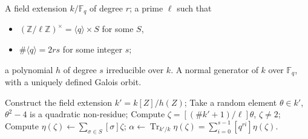 \documentclass{mcom-l}
\theoremstyle{plain}
\theoremstyle{definition}
\DeclareMathOperator{\trace}{Tr} %
\newcommand{\Z}{\ensuremath{\mathbb{Z}}}
\newcommand{\F}{\ensuremath{\mathbb{F}}}
\newcounter{algorithm}
\begin{document}
\begin{algorithm}
  \label{algorithm:rains-conic}
  \begin{algorithmic}[1]
    \REQUIRE A field extension $k/\F_q$ of degree $r$; a prime $\ell$
    such that
    \begin{itemize}
    \item $(\Z/\ell\Z)^\times = \langle q\rangle \times S$ for some $S$,
    \item $\#\langle q\rangle = 2rs$ for some integer $s$;
    \end{itemize}
    a polynomial $h$ of degree $s$ irreducible over $k$.
    \ENSURE A normal generator of $k$ over $\F_q$,
    with a uniquely defined Galois orbit.
    
    \STATE Construct the field extension $k'=k[Z]/h(Z)$;
    \REPEAT
    \REPEAT
    \STATE Take a random element $\theta\in k'$,
    \UNTIL\label{algorithm:rains-conic:sqtest} $\theta^2-4$ is a quadratic non-residue;
    \STATE\label{algorithm:rains-conic:power} Compute $\zeta=[(\#k'+1)/\ell]\theta$,
    \UNTIL $\zeta\ne2$;
    \STATE\label{algorithm:rains-conic:period} Compute $\eta(\zeta) \leftarrow \sum_{\sigma\in S}[\sigma]\zeta$;
    \RETURN\label{algorithm:rains-conic:trace} $\alpha \leftarrow \trace_{k'/k}\eta(\zeta) = \sum_{i=0}^{s-1}[q^{ri}]\eta(\zeta)$.
  \end{algorithmic}
\end{algorithm}
\end{document}
